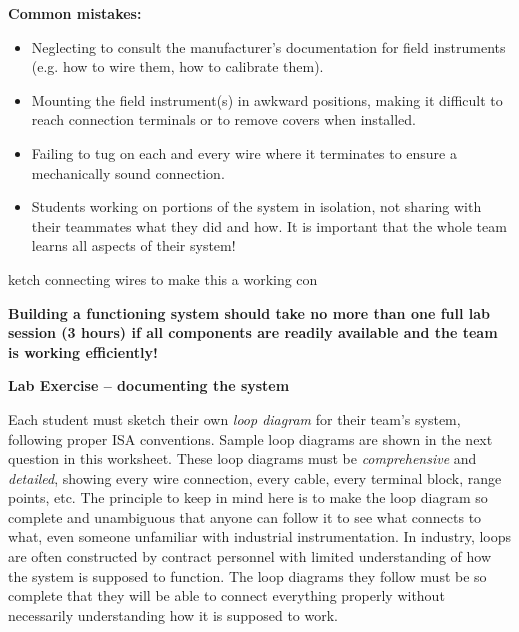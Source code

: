 \begin{itemize}
\vskip 10pt

{\bf Common mistakes:}

\begin{itemize}
\item{} Neglecting to consult the manufacturer's documentation for field instruments (e.g. how to wire them, how to calibrate them).
\item{} Mounting the field instrument(s) in awkward positions, making it difficult to reach connection terminals or to remove covers when installed.
\item{} Failing to tug on each and every wire where it terminates to ensure a mechanically sound connection.
\item{} Students working on portions of the system in isolation, not sharing with their teammates what they did and how.  It is important that the whole team learns all aspects of their system!
\end{itemize}

ketch connecting wires to make this a working con

{\bf Building a functioning system should take no more than one full lab session (3 hours) if all components are readily available and the team is working efficiently!}




\vfil \eject

\noindent
{\bf Lab Exercise -- documenting the system}

\vskip 5pt

Each student must sketch their own {\it loop diagram} for their team's system, following proper ISA conventions.  Sample loop diagrams are shown in the next question in this worksheet.  These loop diagrams must be {\it comprehensive} and {\it detailed}, showing every wire connection, every cable, every terminal block, range points, etc.  The principle to keep in mind here is to make the loop diagram so complete and unambiguous that anyone can follow it to see what connects to what, even someone unfamiliar with industrial instrumentation.  In industry, loops are often constructed by contract personnel with limited understanding of how the system is supposed to function.  The loop diagrams they follow must be so complete that they will be able to connect everything properly without necessarily understanding how it is supposed to work.


\end{itemize}
